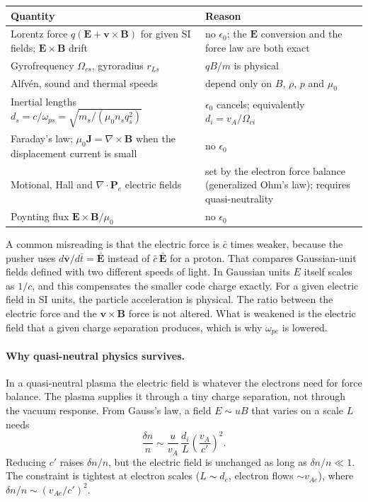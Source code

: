 \documentclass[a4paper, 11pt]{article}
\begin{document}
\begin{center}
\begin{tabular}{p{} p{}}
\hline
Quantity & Reason \\
\hline
Lorentz force $q(\mathbf{E} + \mathbf{v}\times\mathbf{B})$ for given SI fields; $\mathbf{E}\times\mathbf{B}$ drift & no $\epsilon_0$; the $\mathbf{E}$ conversion and the force law are both exact \\
Gyrofrequency $\Omega_{cs}$, gyroradius $r_{Ls}$ & $qB/m$ is physical \\
Alfv\'en, sound and thermal speeds & depend only on $B$, $\rho$, $p$ and $\mu_0$ \\
Inertial lengths $d_s = c/\omega_{ps} = \sqrt{m_s/(\mu_0 n_s q_s^2)}$ & $\epsilon_0$ cancels; equivalently $d_i = v_A/\Omega_{ci}$ \\
Faraday's law; $\mu_0\mathbf{J} = \nabla\times\mathbf{B}$ when the displacement current is small & no $\epsilon_0$ \\
Motional, Hall and $\nabla\cdot\mathbf{P}_e$ electric fields & set by the electron force balance (generalized Ohm's law); requires quasi-neutrality \\
Poynting flux $\mathbf{E}\times\mathbf{B}/\mu_0$ & no $\epsilon_0$ \\
\hline
\end{tabular}
\end{center}

A common misreading is that the electric force is $\bar{c}$ times weaker, because the pusher uses $d\bar{\mathbf{v}}/d\bar{t} = \bar{\mathbf{E}}$ instead of $\bar{c}\,\bar{\mathbf{E}}$ for a proton. That compares Gaussian-unit fields defined with two different speeds of light. In Gaussian units $E$ itself scales as $1/c$, and this compensates the smaller code charge exactly. For a given electric field in SI units, the particle acceleration is physical. The ratio between the electric force and the $\mathbf{v}\times\mathbf{B}$ force is not altered. What is weakened is the electric field that a given charge separation produces, which is why $\omega_{pe}$ is lowered.

\paragraph{Why quasi-neutral physics survives.} In a quasi-neutral plasma the electric field is whatever the electrons need for force balance. The plasma supplies it through a tiny charge separation, not through the vacuum response. From Gauss's law, a field $E \sim uB$ that varies on a scale $L$ needs
\begin{equation}
\frac{\delta n}{n} \sim \frac{u}{v_A}\,\frac{d_i}{L}\left(\frac{v_A}{c'}\right)^2 .
\end{equation}
Reducing $c'$ raises $\delta n/n$, but the electric field is unchanged as long as $\delta n/n \ll 1$. The constraint is tightest at electron scales ($L \sim d_e$, electron flows $\sim v_{Ae}$), where $\delta n/n \sim (v_{Ae}/c')^2$.
\end{document}
